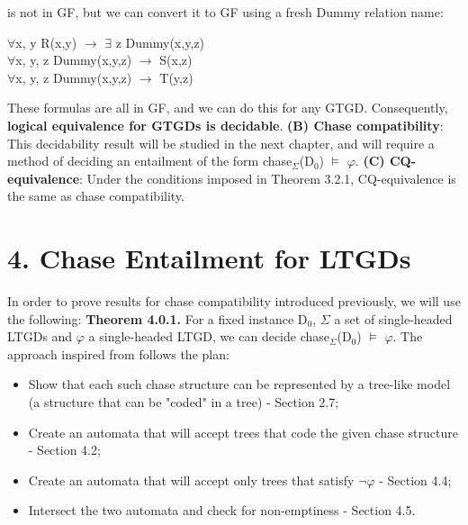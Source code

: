 \documentclass[11pt, a4paper, dvipsnames]{article}
\begin{document}
is not in GF, but we can convert it to GF using a fresh Dummy relation name:
\begin{center}
$\forall$x, y R(x,y) $\rightarrow$ $\exists$ z Dummy(x,y,z)\\
$\forall$x, y, z Dummy(x,y,z) $\rightarrow$ S(x,z)\\
$\forall$x, y, z Dummy(x,y,z) $\rightarrow$ T(y,z)
\end{center}
These formulas are all in GF, and we can do this for any GTGD.\newline
Consequently, \textbf{logical equivalence for GTGDs is decidable}. \newline
\textbf{(B) Chase compatibility}:
This decidability result will be studied in the next chapter, and will require a method of deciding an entailment of the form chase$_{\Sigma}$(D$_{0}$) $\vDash$ $\varphi$.\newline
\textbf{(C) CQ-equivalence}: Under the conditions imposed in Theorem 3.2.1, CQ-equivalence is the same as chase compatibility.  

\newpage

\section{4. Chase Entailment for LTGDs}
In order to prove results for chase compatibility introduced previously, we will use the following:\newline
\textbf{Theorem 4.0.1.} For a fixed instance D$_{0}$, $\Sigma$ a set of single-headed LTGDs and $\varphi$ a single-headed LTGD, we can decide chase$_{\Sigma}$(D$_{0}$) $\vDash$ $\varphi$. \newline
The approach inspired from \cite{decidable} follows the plan:
\begin{itemize}
	\item Show that each such chase structure can be represented by a tree-like model (a structure that can be "coded" in a tree) - Section 2.7;
	\item Create an automata that will accept trees that code the given chase structure - Section 4.2;
	\item Create an automata that will accept only trees that satisfy $\neg \varphi$ - Section 4.4;
	\item Intersect the two automata and check for non-emptiness - Section 4.5.
\end{itemize}
\end{document}
